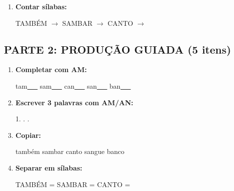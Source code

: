 \begin{exercicio}
\begin{enumerate}
  \item \textbf{Contar sílabas:}
  \begin{center}
  TAMBÉM $\rightarrow$ \underline{\hspace{0.9cm}} \quad SAMBAR $\rightarrow$ \underline{\hspace{0.9cm}} \quad CANTO $\rightarrow$ \underline{\hspace{0.9cm}}
  \end{center}

\end{enumerate}

\subsection*{PARTE 2: PRODUÇÃO GUIADA (5 itens)}

\begin{enumerate}[resume]

  \item \textbf{Completar com AM:}
  \begin{center}
  tam\underline{~~~} \quad sam\underline{~~~} \quad can\underline{~~~} \quad san\underline{~~~} \quad ban\underline{~~~}
  \end{center}

  \item \textbf{Escrever 3 palavras com AM/AN:}
  \begin{center}
  1. \underline{\hspace{3cm}} . \underline{\hspace{3cm}} . \underline{\hspace{3cm}}
  \end{center}

  \item \textbf{Copiar:}
  \begin{center}
  também \quad sambar \quad canto \quad sangue \quad banco
  \end{center}

  \item \textbf{Separar em sílabas:}
  \begin{center}
  TAMBÉM = \underline{\hspace{1cm}} \underline{\hspace{1cm}} \quad SAMBAR = \underline{\hspace{1cm}} \underline{\hspace{1cm}} \quad CANTO = \underline{\hspace{1cm}} \underline{\hspace{1cm}}
  \end{center}


\end{enumerate}
\end{exercicio}
